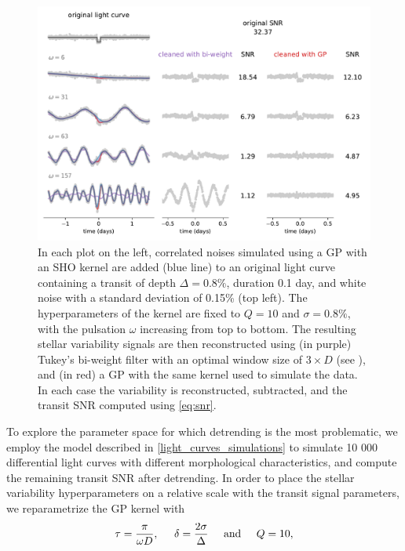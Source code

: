 \documentclass[modern]{aastex631}
\begin{document}
\begin{figure}[H]
    \begin{centering}
        \includegraphics[width=\linewidth]{../workflows/plot_issues/figures/issue2.pdf}
        \caption{In each plot on the left, correlated noises simulated using a GP with an SHO kernel are added (blue line) to an original light curve containing a transit of depth $\Delta = 0.8\%$, duration 0.1 day, and white noise with a standard deviation of 0.15\% (top left). The hyperparameters of the kernel are fixed to $Q=10$ and $\sigma=0.8\%$, with the pulsation $\omega$ increasing from top to bottom. The resulting stellar variability signals are then reconstructed using (in purple) Tukey's bi-weight filter with an optimal window size of $3\times D$  (see \citealt{wotan}), and (in red) a GP with the same kernel used to simulate the data. In each case the variability is reconstructed, subtracted, and the transit SNR computed using \autoref{eq:snr}.}
        \label{fig:issue2}
    \end{centering}
\end{figure}
To explore the parameter space for which detrending is the most problematic, we employ the model described in \autoref{light_curves_simulations} to simulate 10 000 differential light curves with different morphological characteristics, and compute the remaining transit SNR after detrending. In order to place the stellar variability hyperparameters on a relative scale with the transit signal parameters, we reparametrize the GP kernel with
\begin{equation}\label{eq:relative_params}
    \tau = \frac{\pi}{\omega D}, \hspace{0.5cm} 
    \delta = \frac{2\sigma}{\Delta} \hspace{0.5cm}  \text{and}  \hspace{0.5cm}  
    Q = 10,
\end{equation}
\end{document}
